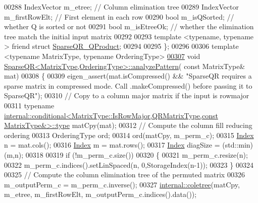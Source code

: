 \begin{DoxyCode}
00288     IndexVector m\_etree;            \textcolor{comment}{// Column elimination tree}
00289     IndexVector m\_firstRowElt;      \textcolor{comment}{// First element in each row}
00290     \textcolor{keywordtype}{bool} m\_isQSorted;               \textcolor{comment}{// whether Q is sorted or not}
00291     \textcolor{keywordtype}{bool} m\_isEtreeOk;               \textcolor{comment}{// whether the elimination tree match the initial input matrix}
00292     
00293     \textcolor{keyword}{template} <\textcolor{keyword}{typename}, \textcolor{keyword}{typename} > \textcolor{keyword}{friend} \textcolor{keyword}{struct }\hyperlink{struct_eigen_1_1_sparse_q_r___q_product}{SparseQR\_QProduct};
00294     
00295 \};
00296 
00306 \textcolor{keyword}{template} <\textcolor{keyword}{typename} MatrixType, \textcolor{keyword}{typename} OrderingType>
\hyperlink{group___sparse_q_r___module_a4b425ddb1358c914d764cde48853a4f6}{00307} \textcolor{keywordtype}{void} \hyperlink{group___sparse_q_r___module_a4b425ddb1358c914d764cde48853a4f6}{SparseQR<MatrixType,OrderingType>::analyzePattern}(\textcolor{keyword}{
      const} MatrixType& mat)
00308 \{
00309   eigen\_assert(mat.isCompressed() && \textcolor{stringliteral}{"SparseQR requires a sparse matrix in compressed mode. Call
       .makeCompressed() before passing it to SparseQR"});
00310   \textcolor{comment}{// Copy to a column major matrix if the input is rowmajor}
00311   \textcolor{keyword}{typename} 
      \hyperlink{class_eigen_1_1internal_1_1_tensor_lazy_evaluator_writable}{internal::conditional<MatrixType::IsRowMajor,QRMatrixType,const MatrixType&>::type}
       matCpy(mat);
00312   \textcolor{comment}{// Compute the column fill reducing ordering}
00313   OrderingType ord; 
00314   ord(matCpy, m\_perm\_c); 
00315   \hyperlink{namespace_eigen_a62e77e0933482dafde8fe197d9a2cfde}{Index} n = mat.cols();
00316   \hyperlink{namespace_eigen_a62e77e0933482dafde8fe197d9a2cfde}{Index} m = mat.rows();
00317   \hyperlink{namespace_eigen_a62e77e0933482dafde8fe197d9a2cfde}{Index} diagSize = (std::min)(m,n);
00318   
00319   \textcolor{keywordflow}{if} (!m\_perm\_c.size())
00320   \{
00321     m\_perm\_c.resize(n);
00322     m\_perm\_c.indices().setLinSpaced(n, 0,StorageIndex(n-1));
00323   \}
00324   
00325   \textcolor{comment}{// Compute the column elimination tree of the permuted matrix}
00326   m\_outputPerm\_c = m\_perm\_c.inverse();
00327   \hyperlink{namespace_eigen_1_1internal_a86181db74ba596a7afbfd89efcc5788c}{internal::coletree}(matCpy, m\_etree, m\_firstRowElt, m\_outputPerm\_c.indices().data());

\end{DoxyCode}
